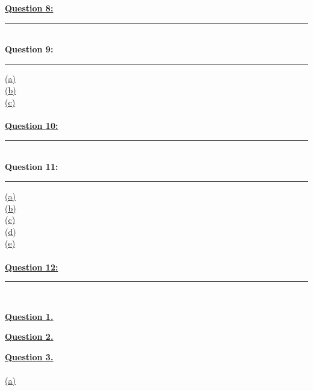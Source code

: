 \documentclass[12pt]{article}
\begin{document}
\hyperlink{8}{\textbf{Question 8:}}
\vspace{1mm}
\hrule
~\\

{\textbf{Question 9:}}
\vspace{1mm}
\hrule
\vspace{1mm}
\hyperlink{9.1}{(a)}\\
\hyperlink{9.2}{(b)}\\
\hyperlink{9.3}{(c)}\\
\\

\hyperlink{10}{\textbf{Question 10:}}
\vspace{1mm}
\hrule
~\\

{\textbf{Question 11:}}
\vspace{1mm}
\hrule
\vspace{1mm}
\hyperlink{11.1}{(a)}\\
\hyperlink{11.2}{(b)}\\
\hyperlink{11.3}{(c)}\\
\hyperlink{11.4}{(d)}\\
\hyperlink{11.5}{(e)}\\
\\

\hyperlink{12}{\textbf{Question 12:}}
\vspace{1mm}
\hrule
~\\

\newpage

\hyperlink{toc}{\hypertarget{1}{\LARGE \underline{\textbf{Question 1.}}}}\\
\newpage

\hyperlink{toc}{\hypertarget{2}{\LARGE \underline{\textbf{Question 2.}}}}\\
\newpage

\hyperlink{toc}{\LARGE \underline{\textbf{Question 3.}}}\\
~\\\hyperlink{toc}{\hypertarget{3.1}{(a)}}\\
\end{document}
